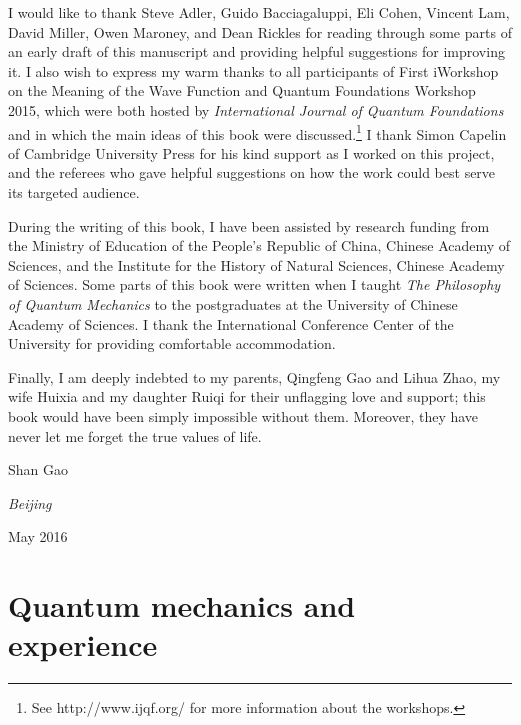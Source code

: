 
I would like to thank Steve Adler, Guido Bacciagaluppi, Eli Cohen, Vincent Lam, David Miller, Owen Maroney, and Dean Rickles for reading through some parts of an early draft of this manuscript and providing helpful suggestions for improving it. I also wish to express my warm thanks to all participants of First iWorkshop on the Meaning of the Wave Function and Quantum Foundations Workshop 2015, which were both hosted by \emph{International Journal of Quantum Foundations} and in which the main ideas of this book were discussed.\footnote{See http://www.ijqf.org/ for more information about the workshops.} 
I thank Simon Capelin of Cambridge University Press for his kind support as I worked on this project, and the referees who gave helpful suggestions on how the work could best serve its targeted audience. 

During the writing of this book, I have been assisted by research funding from the Ministry of Education of the People's Republic of China, Chinese Academy of Sciences, and the Institute for the History of Natural Sciences, Chinese Academy of Sciences. Some parts of this book were written when I taught \emph{The Philosophy of Quantum Mechanics} to the postgraduates at the University of Chinese Academy of Sciences. I thank the International Conference Center of the University for providing comfortable accommodation. 

Finally, I am deeply indebted to my parents, Qingfeng Gao and Lihua Zhao, my wife Huixia and my daughter Ruiqi for their unflagging love and support; this book would have been simply impossible without them. Moreover, they have never let me forget the true values of life.

\hfill Shan Gao

\hfill \emph{Beijing} 

\hfill May 2016


\chapter{Quantum mechanics and experience}




